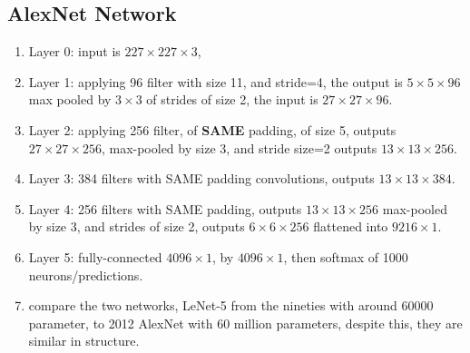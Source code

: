 \documentclass[4apaper,12pt]{book}
\begin{document}
  \subsection{AlexNet Network}
  \begin{enumerate}
  \item Layer 0: input is $227\times{227} \times{3}$,
  \item Layer 1: applying 96 filter with size 11, and stride=4, the output is $5 \times{5} \times{96}$ max pooled by $3\times{3}$ of strides of size 2, the input is $27\times 27 \times 96$.
  \item Layer 2: applying 256 filter, of \textbf{SAME} padding, of size 5, outputs $27 \times27 \times 256$, max-pooled by size 3, and stride size=2 outputs $13 \times 13 \times 256$.
  \item Layer 3: 384 filters with SAME padding convolutions, outputs $13 \times {13} \times {384}$.
  \item Layer 4: 256 filters with SAME padding, outputs $13\times{13}\times{256}$ max-pooled by size 3, and strides of size 2, outputs $6\times{6}\times{256}$ flattened into $9216\times{1}$.
  \item Layer 5: fully-connected $4096\times{1}$, by $4096\times{1}$, then softmax of 1000 neurons/predictions.
  \item compare the two networks, LeNet-5 from the nineties with around 60000 parameter, to 2012 AlexNet with 60 million parameters, despite this, they are similar in structure.
  \end{enumerate}
\end{document}
